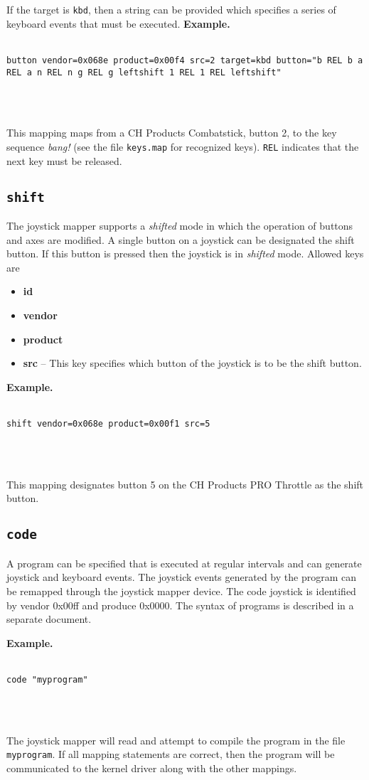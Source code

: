 \documentclass{article}
\begin{document}
If the target is {\tt kbd}, then a string can be provided which specifies a series
of keyboard events that must be executed.
{\bf Example.}\\
\strut\\
{\tt button vendor=0x068e product=0x00f4 src=2 target=kbd button="b REL b a REL a n REL n g REL g leftshift 1 REL 1 REL leftshift"}
\strut\\
\strut\\
This mapping maps from a CH Products Combatstick, button 2, to the key sequence {\sl bang!} (see the file {\tt keys.map}
for recognized keys). {\tt REL} indicates that the next key must be released.
\subsection{{\tt shift}}
The joystick mapper supports a {\sl shifted} mode in which the operation of buttons and axes
are modified. A single button on a joystick can be designated the shift button. If
this button is pressed then the joystick is in {\sl shifted} mode. Allowed keys are
\begin{itemize}
	\item {\bf id}
	\item {\bf vendor}
	\item {\bf product}
	\item {\bf src} -- This key specifies which button of the joystick is to be the shift button.
\end{itemize}

{\bf Example.}\\
\strut\\
{\tt shift vendor=0x068e product=0x00f1 src=5}
\strut\\
\strut\\
This mapping designates button 5 on the CH Products PRO Throttle as the shift button.
\subsection{{\tt code}}
A program can be specified that is executed at regular intervals and can generate
joystick and keyboard events. The joystick events generated by the program can be remapped  
through the joystick mapper device. The code joystick is identified by vendor 0x00ff and
produce 0x0000. The syntax of programs is described in a separate document.

{\bf Example.}\\
\strut\\
{\tt code "myprogram"}
\strut\\
\strut\\
The joystick mapper will read and attempt to compile the program in the file {\tt myprogram}.
If all mapping statements are correct, then the program will be communicated to 
the kernel driver along with the other mappings.
\end{document}
